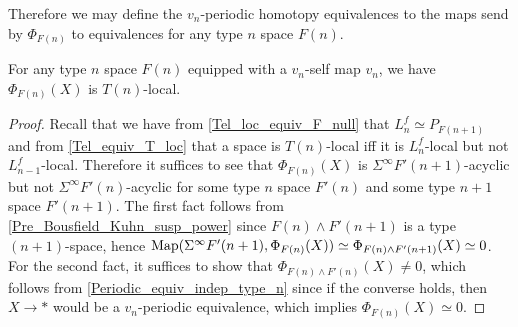 	Therefore we may define the $v_n$-periodic homotopy equivalences to the maps send by $\Phi_{F(n)}$ to equivalences for any type $n$ space $F(n)$. 

	\begin{thm}\label{Pre_Bousfield_Kuhn_T_n_loc}
		For any type $n$ space $F(n)$ equipped with a $v_n$-self map $v_n$, we have $\Phi_{F(n)}(X)$ is $T(n)$-local. 
	\end{thm}
	\begin{proof}
		Recall that we have from \cref{Tel_loc_equiv_F_null} that $L_n^f\simeq P_{F(n+1)}$ and from \cref{Tel_equiv_T_loc} that a space is $T(n)$-local iff it is $L_n^f$-local but not $L_{n-1}^f$-local. Therefore it suffices to see that $\Phi_{F(n)}(X)$ is $\Sigma^\infty F'(n+1)$-acyclic but not $\Sigma^\infty F'(n)$-acyclic for some type $n$ space $F'(n)$ and some type $n+1$ space $F'(n+1)$. The first fact follows from \cref{Pre_Bousfield_Kuhn_susp_power} since $F(n)\wedge F'(n+1)$ is a type $(n+1)$-space, hence $\operatorname{\mathrm{Map}}(\Sigma^\infty F'(n+1),\Phi_{F(n)}(X))\simeq\Phi_{F(n)\wedge F'(n+1)}(X)\simeq0$. For the second fact, it suffices to show that $\Phi_{F(n)\wedge F'(n)}(X)\neq0$, which follows from \cref{Periodic_equiv_indep_type_n} since if the converse holds, then $X\to *$ would be a $v_n$-periodic equivalence, which implies $\Phi_{F(n)}(X)\simeq0$. 
	\end{proof}

